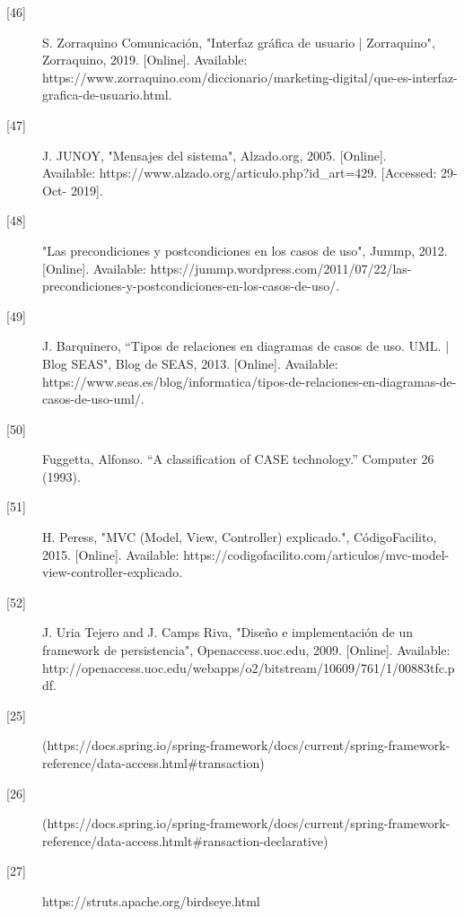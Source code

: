\begin{description}
		\item[\hypertarget{b46}{[46]}] S. Zorraquino Comunicación, "Interfaz gráfica de usuario | Zorraquino", Zorraquino, 2019. [Online]. Available: https://www.zorraquino.com/diccionario/marketing-digital/que-es-interfaz-grafica-de-usuario.html.
		
		\item[\hypertarget{b47}{[47]}]J. JUNOY, "Mensajes del sistema", Alzado.org, 2005. [Online]. \\ Available: https://www.alzado.org/articulo.php?id\_art=429. [Accessed: 29- Oct- 2019].
		
		\item[\hypertarget{b48}{[48]}]"Las precondiciones y postcondiciones en los casos de uso", Jummp, 2012. [Online]. Available: https://jummp.wordpress.com/2011/07/22/las-precondiciones-y-postcondiciones-en-los-casos-de-uso/.
		
		\item[\hypertarget{b49}{[49]}]J. Barquinero, “Tipos de relaciones en diagramas de casos de uso. UML. | Blog SEAS", Blog de SEAS, 2013. [Online]. Available: https://www.seas.es/blog/informatica/tipos-de-relaciones-en-diagramas-de-casos-de-uso-uml/. 
		
		\item[\hypertarget{b50}{[50]}] Fuggetta, Alfonso. “A classification of CASE technology.” Computer 26 (1993).
		
		\item[\hypertarget{b51}{[51]}] H. Peress, "MVC (Model, View, Controller) explicado.", CódigoFacilito, 2015. [Online]. Available: https://codigofacilito.com/articulos/mvc-model-view-controller-explicado. \\
		
		\item[\hypertarget{b52}{[52]}] J. Uria Tejero and J. Camps Riva, "Diseño e implementación de un framework de persistencia", Openaccess.uoc.edu, 2009. [Online]. Available: http://openaccess.uoc.edu/webapps/o2/bitstream/10609/761/1/00883tfc.pdf.
		
		\item[\hypertarget{b25}{[25]}] (https://docs.spring.io/spring-framework/docs/current/spring-framework-reference/data-access.html\#transaction)
		
		\item[\hypertarget{b26}{[26]}] (https://docs.spring.io/spring-framework/docs/current/spring-framework-reference/data-access.htmlt\#ransaction-declarative)
		
		\item[\hypertarget{b27}{[27]}] https://struts.apache.org/birdseye.html 
		

\end{description}
